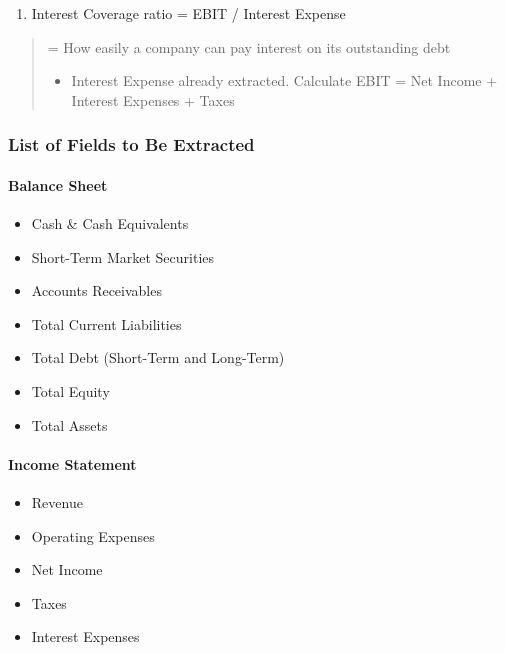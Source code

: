 \documentclass[12pt,a4paper]{article}
\begin{document}
\begin{enumerate}
\def\labelenumi{\arabic{enumi}.}
\setcounter{enumi}{6}
\item
  Interest Coverage ratio = EBIT / Interest Expense
\end{enumerate}

\begin{quote}
= How easily a company can pay interest on its outstanding debt

\begin{itemize}
\item
  Interest Expense already extracted. Calculate EBIT = Net Income +
  Interest Expenses + Taxes
\end{itemize}
\end{quote}

\subsubsection{List of Fields to Be Extracted}

\paragraph{Balance Sheet}

\begin{itemize}
\item
  Cash \& Cash Equivalents
\item
  Short-Term Market Securities
\item
  Accounts Receivables
\item
  Total Current Liabilities
\item
  Total Debt (Short-Term and Long-Term)
\item
  Total Equity
\item
  Total Assets
\end{itemize}

\paragraph{Income Statement}

\begin{itemize}
\item
  Revenue
\item
  Operating Expenses
\item
  Net Income
\item
  Taxes
\item
  Interest Expenses
\end{itemize}
\end{document}
